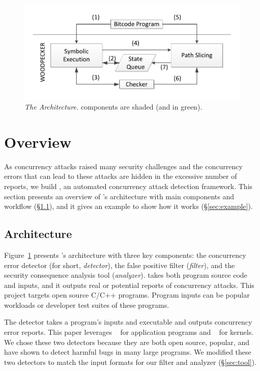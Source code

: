 \begin{figure}[!htb]
\centering
\includegraphics[width=1\textwidth]{figures/arch}
\vspace{-.10in}
\caption{{\em The \xxx Architecture.} \rm {\xxx components are shaded (and in
  green).}} \label{fig:arch}
\vspace{-.05in}
\end{figure}

\section{\xxx Overview}\label{sec:overview}

As concurrency attacks raised many security challenges and the concurrency 
errors that can lead to these attacks are hidden in the excessive number of 
reports, we build \xxx, an automated concurrency attack detection 
framework. This section presents an overview of \xxx's architecture with main 
components and workflow (\S\ref{sec:arch}), and it gives an example to show how 
it works (\S\ref{sec:example}).



\subsection{Architecture}\label{sec:arch}

Figure~\ref{fig:arch} presents \xxx's architecture with three key components: 
the concurrency error detector (for short, \emph{detector}), the false positive 
filter (\emph{filter}), and the security consequence analysis tool 
(\emph{analyzer}). \xxx takes both program source code and inputs, and it 
outputs real or potential reports of concurrency attacks. This project 
targets open source C/C++ programs. Program inputs can be popular workloads or 
developer test suites of these programs.

The detector takes a program's inputs and executable and outputs concurrency 
error reports. This paper leverages \tsan~\cite{tsan:wbia09} for 
application programs and \ski~\cite{ski:osdi14} for kernels. We chose these two 
detectors because they are both open source, popular, and have shown to detect 
harmful bugs in many large programs. We modified these two detectors to match the 
input formats for our filter and analyzer (\S\ref{sec:tool}).

